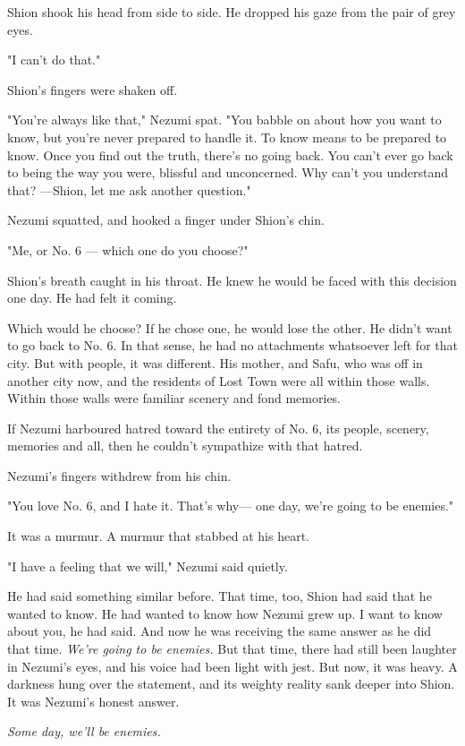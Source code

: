 Shion shook his head from side to side. He dropped his gaze from the
pair of grey eyes.

"I can't do that."

Shion's fingers were shaken off.

"You're always like that," Nezumi spat. "You babble on about how you
want to know, but you're never prepared to handle it. To know means to
be prepared to know. Once you find out the truth, there's no going back.
You can't ever go back to being the way you were, blissful and
unconcerned. Why can't you understand that? ---Shion, let me ask another
question."

Nezumi squatted, and hooked a finger under Shion's chin.

"Me, or No. 6 --- which one do you choose?"

Shion's breath caught in his throat. He knew he would be faced with this
decision one day. He had felt it coming.

Which would he choose? If he chose one, he would lose the other. He
didn't want to go back to No. 6. In that sense, he had no attachments
whatsoever left for that city. But with people, it was different. His
mother, and Safu, who was off in another city now, and the residents of
Lost Town were all within those walls. Within those walls were familiar
scenery and fond memories.

If Nezumi harboured hatred toward the entirety of No. 6, its people,
scenery, memories and all, then he couldn't sympathize with that hatred.

Nezumi's fingers withdrew from his chin.

"You love No. 6, and I hate it. That's why--- one day, we're going to be
enemies."

It was a murmur. A murmur that stabbed at his heart.

"I have a feeling that we will," Nezumi said quietly.

He had said something similar before. That time, too, Shion had said
that he wanted to know. He had wanted to know how Nezumi grew up. I want
to know about you, he had said. And now he was receiving the same answer
as he did that time. \emph{We're going to be enemies.} But that time, there had
still been laughter in Nezumi's eyes, and his voice had been light with
jest. But now, it was heavy. A darkness hung over the statement, and its
weighty reality sank deeper into Shion. It was Nezumi's honest answer.

\emph{Some day, we'll be enemies.}

